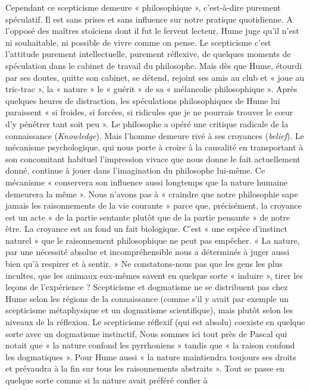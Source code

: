 Cependant ce scepticisme demeure « philosophique »,
c’est-à-dire purement spéculatif. Il est sans prises et sans
influence sur notre pratique quotidienne. A l’opposé des
maîtres stoïciens dont il fut le fervent lecteur, Hume
juge qu’il n’est ni souhaitable, ni possible de vivre comme
on pense. Le scepticisme c’est l’attitude purement intellectuelle, 
purement réflexive, de quelques moments de
spéculation dans le cabinet de travail du philosophe.
Mais dès que Hume, étourdi par ses doutes, quitte son
cabinet, se détend, rejoint ses amis au club et « joue au
tric-trac », la « nature » le « guérit » de sa « mélancolie
philosophique ». Après quelques heures de distraction,
les spéculations philosophiques de Hume lui paraissent
« si froides, si forcées, si ridicules que je ne pourrais trouver
le cœur d’y pénétrer tant soit peu ». Le philosophe a opéré
une critique radicale de la connaissance ({\it Knowledge}).
Mais l’homme demeure rivé à ses croyances ({\it belief}).
Le mécanisme psychologique, qui nous porte à croire à la
causalité en transportant à son concomitant habituel
l'impression vivace que nous donne le fait actuellement
donné, continue à jouer dans l’imagination du philosophe
lui-même. Ce mécanisme « conservera son influence aussi
longtemps que la nature humaine demeurera la même ».
Nous n’avons pas à « craindre que notre philosophie sape
jamais les raisonnements de la vie courante » parce que,
précisément, la croyance est un acte « de la partie sentante
plutôt que de la partie pensante » de notre être. La croyance
est au fond un fait biologique. C’est « une espèce d’instinct
naturel » que le raisonnement philosophique ne peut pas
empêcher. « La nature, par une nécessité absolue et incompréhensible 
nous a déterminés à juger aussi bien qu’à
respirer et à sentir. » Ne constatons-nous pas que les gens
les plus incultes, que les animaux eux-mêmes savent en
quelque sorte « induire », tirer les leçons de l’expérience ?
Scepticisme et dogmatisme ne se distribuent pas chez
Hume selon les régions de la connaissance (comme s’il
y avait par exemple un scepticisme métaphysique et un
dogmatisme scientifique), mais plutôt selon les niveaux
de la réflexion. Le scepticisme réflexif (qui est absolu)
coexiste en quelque sorte avec un dogmatisme instinctif,
Nous sommes ici tout près de Pascal qui notait que « la
nature confond les pyrrhoniens » tandis que « la raison
confond les dogmatiques ». Pour Hume aussi « la nature
maintiendra toujours ses droits et prévaudra à la fin
sur tous les raisonnements abstraits ». Tout se passe en
quelque sorte comme si la nature avait préféré confier à
